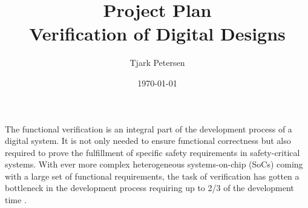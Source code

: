 \documentclass[11pt]{article}
\begin{document}
\title{{\Huge Project Plan}\\ Verification of Digital Designs}
\author{Tjark Petersen}
\date{\today}

\maketitle


\begin{comment}
- verification important -> not only for functional correctness, but required for safety-critical systems
- in the critical path of the development process \cite{bergeron2012writing}
- consumes more than 2/3 of the development time \cite{bergeron2012writing}
- dedicated verification engineers
- intricate process, not any more just writing a testbench with some directed test cases
- complex environments, complex SoCs, random stimulus, coverage-driven verification, formal verification, etc.
- abstraction can help to manage complexity \cite{bergeron2012writing}
- but we have balance control and abstraction \cite{bergeron2012writing}



- HVLs were introduced to abstract and ease testbench development
- intially co-simulation based like Vera added crv, OOP, etc.
- today SV merged SuperLog and Vera -> single language

- SV alone provides primitives for creation of best practice test environments
- but no guidlines of how to do so -> no reuse
- UVM introduces framework for creation of sophisticated testbenches in SV which encourage reuse by providing guidelines and class hierarchies \cite{flake2020a}
- standard from 2017




- "all verification projects present a recurring set of challenges; hence, valuable time and effort are saved by reusing code common to all environments. This is achieved with a software library that provides verification facilities such as error reporting and communications handshaking" \cite{flake2020a}


\end{comment}

The functional verification is an integral part of the development process of a digital system. It is not only needed to ensure functional correctness but also required to prove the fulfillment of specific safety requirements in safety-critical systems. 
With ever more complex heterogeneous systems-on-chip (SoCs) coming with a large set of functional requirements, the task of verification has gotten a bottleneck in the development process requiring up to 2/3 of the development time \cite{bergeron2012writing}.
\end{document}
